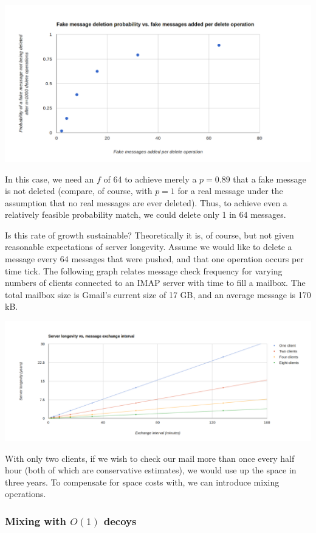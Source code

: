 \documentclass[pageno]{jpaper}
\begin{document}
\includegraphics[width=\textwidth]{fake-message-deletion-probability-vs-num-fake-messages-added}

In this case, we need an $f$ of 64 to achieve merely a $p=0.89$ that a fake message is not deleted (compare, of course, with $p=1$ for a real message under the assumption that no real messages are ever deleted). Thus, to achieve even a relatively feasible probability match, we could delete only 1 in 64 messages.

Is this rate of growth sustainable? Theoretically it is, of course, but not given reasonable expectations of server longevity. Assume we would like to delete a message every 64 messages that were pushed, and that one operation occurs per time tick. The following graph relates message check frequency for varying numbers of clients connected to an IMAP server with time to fill a mailbox. The total mailbox size is Gmail's current size of 17 GB, and an average message is 170 kB.

\includegraphics[width=\textwidth]{server_longevity}

With only two clients, if we wish to check our mail more than once every half hour (both of which are conservative estimates), we would use up the space in three years. To compensate for space costs with, we can introduce mixing operations.

\subsubsection{Mixing with \texorpdfstring{$O(1)$}{O(1)} decoys}
\end{document}
